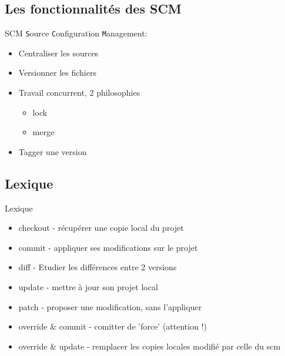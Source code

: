 \documentclass[handout]{beamer}
\begin{document}
\subsection{Les fonctionnalités des SCM}
\begin{frame}
	\begin{block}{SCM}
		\texttt{S}ource \texttt{C}onfiguration \texttt{M}anagement:
		\begin{itemize}
			\item Centraliser les sources
			\item Versionner les fichiers
			\item Travail concurrent, 2 philosophies
				\begin{itemize}
					\item lock 
					\item merge 
				\end{itemize}
			\item Tagger une version 
		\end{itemize}
	\end{block}
\end{frame}
\subsection{Lexique}
\begin{frame}
	\begin{block}{Lexique}
		\begin{itemize}
			\item checkout - récupérer une copie local du projet
			\item commit - appliquer ses modifications sur le projet
			\item diff - Etudier les différences entre 2 versions
			\item update - mettre à jour son projet local
			\item patch - proposer une modification, sans l'appliquer
			\item override \& commit - comitter de 'force' (attention !)
			\item override \& update - remplacer les copies locales modifié par celle du scm 
		\end{itemize}
	\end{block}
\end{frame}
\end{document}
